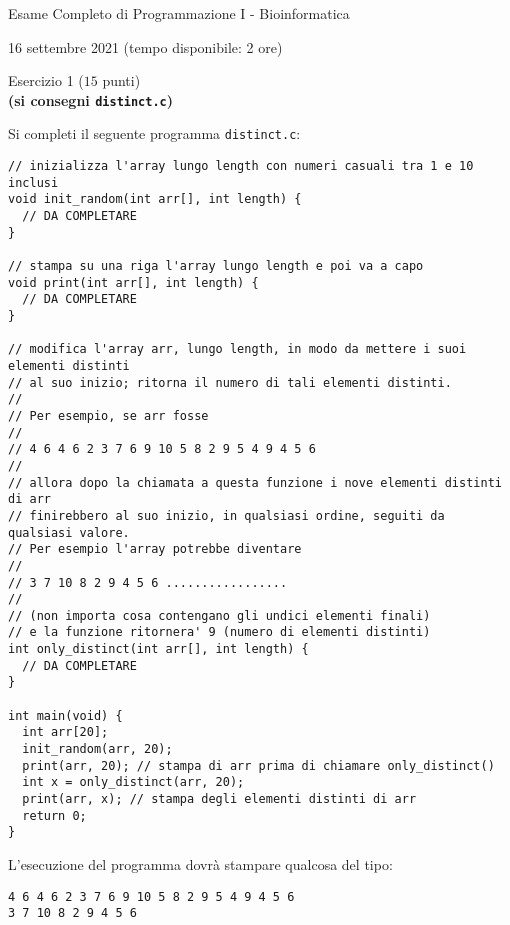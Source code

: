 \documentclass[12pt]{article}
\begin{document}
\begin{center}{\LARGE Esame Completo di Programmazione I - Bioinformatica}\\
\begin{center}
  \large 16 settembre 2021 (tempo disponibile: 2 ore)
\end{center}
\end{center}

\vspace*{1ex}
\begin{center}{\Large Esercizio 1} ($15$ punti)\\
  \textbf{(si consegni \texttt{distinct.c})}
\end{center}
Si completi il seguente programma \texttt{distinct.c}:

\begin{center}
\begin{lstlisting}[language=myC]
// inizializza l'array lungo length con numeri casuali tra 1 e 10 inclusi
void init_random(int arr[], int length) {
  // DA COMPLETARE
}

// stampa su una riga l'array lungo length e poi va a capo
void print(int arr[], int length) {
  // DA COMPLETARE
}

// modifica l'array arr, lungo length, in modo da mettere i suoi elementi distinti
// al suo inizio; ritorna il numero di tali elementi distinti.
//
// Per esempio, se arr fosse
//
// 4 6 4 6 2 3 7 6 9 10 5 8 2 9 5 4 9 4 5 6
//
// allora dopo la chiamata a questa funzione i nove elementi distinti di arr
// finirebbero al suo inizio, in qualsiasi ordine, seguiti da qualsiasi valore.
// Per esempio l'array potrebbe diventare
//
// 3 7 10 8 2 9 4 5 6 .................
//
// (non importa cosa contengano gli undici elementi finali)
// e la funzione ritornera' 9 (numero di elementi distinti)
int only_distinct(int arr[], int length) {
  // DA COMPLETARE
}

int main(void) {
  int arr[20];
  init_random(arr, 20);
  print(arr, 20); // stampa di arr prima di chiamare only_distinct()
  int x = only_distinct(arr, 20);
  print(arr, x); // stampa degli elementi distinti di arr
  return 0;
}
\end{lstlisting}
\end{center}

\noindent
L'esecuzione del programma dovr\`a stampare qualcosa del tipo:

\begin{mdframed}[backgroundcolor=lightgrey] 
{\scriptsize\begin{verbatim}
4 6 4 6 2 3 7 6 9 10 5 8 2 9 5 4 9 4 5 6 
3 7 10 8 2 9 4 5 6
\end{verbatim}}
\end{mdframed}
\end{document}
